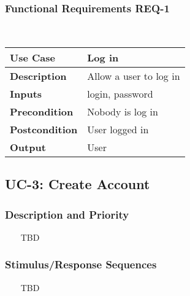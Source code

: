 \documentclass{report}
\begin{document}
\subsubsection*{Functional Requirements REQ-1} ~~~
\begin{center}
	\begin{tabular}{|m{4cm}|m{10cm}|}
	\hline
	\textbf{Use Case} & Log in \\
	\hline
	\textbf{Description} & Allow a user to log in  \\
	\hline
	\textbf{Inputs} & login, password \\
	\hline
	\textbf{Precondition} & Nobody is log in  \\
	\hline
	\textbf{Postcondition} & User logged in \\
	\hline
	\textbf{Output} & User \\
	\hline
	\end{tabular}
\end{center}





\subsection{UC-3: Create Account}

\subsubsection*{Description and Priority} ~~~
TBD

\subsubsection*{Stimulus/Response Sequences} ~~~
TBD
\end{document}
